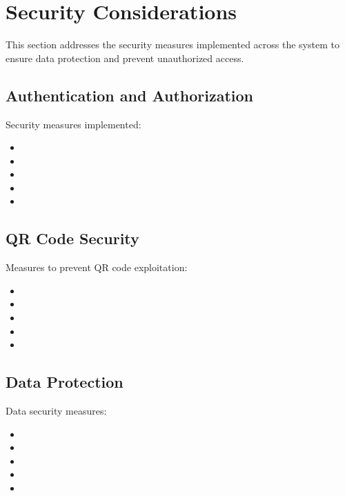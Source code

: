 \section{Security Considerations}
\begin{warningbox}
This section addresses the security measures implemented across the system to ensure data protection and prevent unauthorized access.
\end{warningbox}

\subsection{Authentication and Authorization}
\textcolor{TextBlack}{
    Security measures implemented:
    \begin{itemize}
        \item {}
        \item {}
        \item {}
        \item {}
        \item {}
    \end{itemize}
}

\subsection{QR Code Security}
\textcolor{TextBlack}{
    Measures to prevent QR code exploitation:
    \begin{itemize}
        \item {}
        \item {}
        \item {}
        \item {}
        \item {}
    \end{itemize}
}

\subsection{Data Protection}
\begin{notebox}
\textcolor{TextBlack}{
    Data security measures:
    \begin{itemize}
        \item {}
        \item {}
        \item {}
        \item {}
        \item {}
    \end{itemize}
}
\end{notebox}
